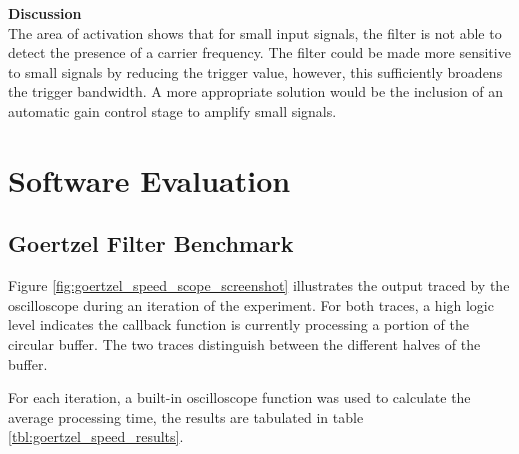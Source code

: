 \textbf{Discussion}\\
The area of activation shows that for small input signals, the filter is not able to detect the presence of a carrier frequency. The filter could be made more sensitive to small signals by reducing the trigger value, however, this sufficiently broadens the trigger bandwidth. A more appropriate solution would be the inclusion of an automatic gain control stage to amplify small signals.








\section{Software Evaluation}


\subsection{Goertzel Filter Benchmark}

Figure \ref{fig:goertzel_speed_scope_screenshot} illustrates the output traced by the oscilloscope during an iteration of the experiment. For both traces, a high logic level indicates the callback function is currently processing a portion of the circular buffer. The two traces distinguish between the different halves of the buffer.

For each iteration, a built-in oscilloscope function was used to calculate the average processing time, the results are tabulated in table \ref{tbl:goertzel_speed_results}.

